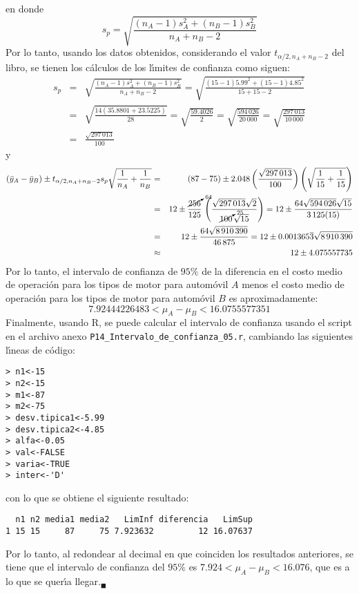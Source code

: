 \begin{solucion}
 en donde
 \begin{equation*}
  s_p = \sqrt{\frac{\left( n_A - 1 \right)s_A^2 + \left( n_B - 1 \right)s_B^2}{n_A + n_B - 2}}
 \end{equation*}
 Por lo tanto, usando los datos obtenidos, considerando el valor $t_{\alpha/2,n_A+n_B - 2}$ del libro, se tienen los c\'alculos de los l\'{\i}mites de confianza como siguen:
 \begin{eqnarray*}
  s_p & = & \sqrt{\frac{\left( n_A - 1 \right)s_A^2 + \left( n_B - 1 \right)s_B^2}{n_A + n_B - 2}} = \sqrt{\frac{(15-1)5.99^2 + (15-1)4.85^2}{15 + 15 - 2}} \\
  & = & \sqrt{\frac{14( 35.8801 + 23.5225)}{28}} = \sqrt{\frac{59.4026}{2}} = \sqrt{\frac{594\,026}{20\,000}} = \sqrt{\frac{297\,013}{10\,000}} \\ 
  & = & \frac{\sqrt{297\,013}}{100}
 \end{eqnarray*}
 y
 \begin{eqnarray*}
  \left( \bar{y}_A - \bar{y}_B \right) \pm t_{\alpha/2,n_A+n_B-2}s_p\sqrt{\frac{1}{n_A} + \frac{1}{n_B}} & = & (87 - 75) \pm 2.048\left( \frac{\sqrt{297\,013}}{100} \right) \left( \sqrt{\frac{1}{15} + \frac{1}{15}}\right) \\
  & = & 12 \pm  \frac{\cancelto{64}{256}}{125} \, \left( \frac{\sqrt{297\,013}\sqrt{2}}{\cancelto{25}{100}\,\sqrt{15}} \right) = 12 \pm \frac{64\sqrt{594\,026}\sqrt{15}}{3\,125(15)} \\
  & = & 12 \pm \frac{64\sqrt{8\,910\,390}}{46\,875} = 12 \pm 0.001365\overline{3}\sqrt{8\,910\,390} \\
  & \approx & 12 \pm 4.075557735
 \end{eqnarray*}
 Por lo tanto, el intervalo de confianza de $95\%$ de la diferencia en el costo medio de operaci\'on para los tipos de motor para autom\'ovil $A$ menos el costo medio de operaci\'on para los tipos de motor para autom\'ovil $B$ es aproximadamente:
 \begin{equation*}
  7.92444226483 < \mu_A - \mu_B < 16.0755577351
 \end{equation*}
 Finalmente, usando R, se puede calcular el intervalo de confianza usando el script en el archivo anexo \texttt{P14\_Intervalo\_de\_confianza\_05.r}, cambiando las siguientes l\'{\i}neas de c\'odigo:
 \begin{verbatim}
> n1<-15
> n2<-15
> m1<-87
> m2<-75
> desv.tipica1<-5.99
> desv.tipica2<-4.85
> alfa<-0.05
> val<-FALSE
> varia<-TRUE
> inter<-'D'
 \end{verbatim}
 \vspace{-0.5cm}
 con lo que se obtiene el siguiente resultado:
 \begin{verbatim}
  n1 n2 media1 media2   LimInf diferencia   LimSup
1 15 15     87     75 7.923632         12 16.07637
 \end{verbatim}
 \vspace{-0.5cm}
 Por lo tanto, al redondear al decimal en que coinciden los resultados anteriores, se tiene que el intervalo de confianza del $95\%$ es $7.924 < \mu_A - \mu_B < 16.076$, que es a lo que se quer\'{\i}a llegar.${}_{\blacksquare}$
\end{solucion}
